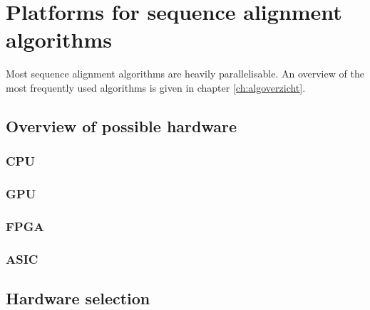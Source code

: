 
\chapter{Platforms for sequence alignment algorithms}

Most sequence alignment algorithms are heavily parallelisable. An overview of the most frequently used algorithms is given in chapter \ref{ch:algoverzicht}.

\section{Overview of possible hardware}

\subsection{CPU}
\subsection{GPU}
\subsection{FPGA}
\subsection{ASIC}

\section{Hardware selection}


